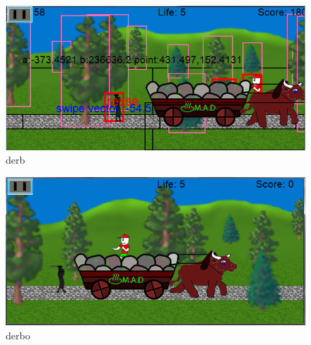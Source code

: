 \documentclass[Main.tex]{TeksturSkalering}
\begin{document}
\begin{figure}
\centering
\includegraphics[width = 7 cm]{billeder/MADscaling5}
\caption{derb}
\label{MADscaling5}
\end{figure}

\begin{figure}
\centering
\includegraphics[width = 7 cm]{billeder/MADscaling6}
\caption{derbo}
\label{MADscaling6}
\end{figure}
\end{document}
